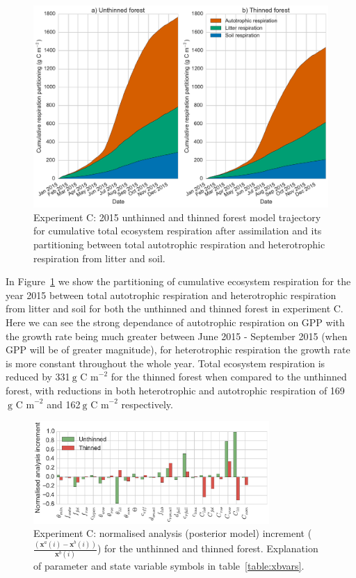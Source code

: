 \documentclass[draft,linenumbers]{agujournal}
\begin{document}
\begin{figure}[ht]
    \centering
        \includegraphics[width=\textwidth]{resp_partc.pdf}
    \caption{Experiment C: 2015 unthinned and thinned forest model trajectory for cumulative total ecosystem respiration after assimilation and its partitioning between total autotrophic respiration and heterotrophic respiration from litter and soil.} \label{fig:rt_part}
\end{figure}

In Figure~\ref{fig:rt_part} we show the partitioning of cumulative ecosystem respiration for the year 2015 between total autotrophic respiration and heterotrophic respiration from litter and soil for both the unthinned and thinned forest in experiment C. Here we can see the strong dependance of autotrophic respiration on GPP with the growth rate being much greater between June 2015 - September 2015 (when GPP will be of greater magnitude), for heterotrophic respiration the growth rate is more constant throughout the whole year. Total ecosystem respiration is reduced by 331\(~\text{g C m}^{-2}\) for the thinned forest when compared to the unthinned forest, with reductions in both heterotrophic and autotrophic respiration of 169\(~\text{g C m}^{-2}\) and 162\(~\text{g C m}^{-2}\) respectively.    

\begin{figure}[ht]
    \centering
    \includegraphics[width=0.8\textwidth]{xa_incc.pdf}
    \caption{Experiment C: normalised analysis (posterior model) increment \big($\frac{(\textbf{x}^a(i) - \textbf{x}^b(i))}{\textbf{x}^b(i)}$\big) for the unthinned and thinned forest. Explanation of parameter and state variable symbols in table~\ref{table:xbvars}.}
    \label{fig:xa_inc}
\end{figure}
\end{document}
